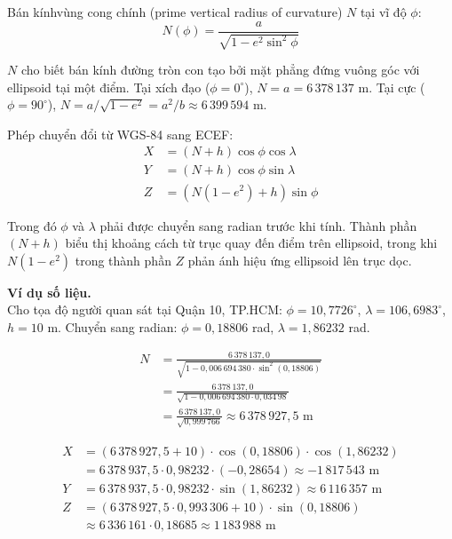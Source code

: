 Bán kínhvùng cong chính (prime vertical radius of curvature) $N$ tại vĩ độ $\phi$:
\begin{equation}
    N(\phi) = \frac{a}{\sqrt{1 - e^2 \sin^2\phi}}
\end{equation}

$N$ cho biết bán kính đường tròn con tạo bởi mặt phẳng đứng vuông góc với ellipsoid tại một điểm. Tại xích đạo ($\phi = 0^\circ$), $N = a = 6\,378\,137$ m. Tại cực ($\phi = 90^\circ$), $N = a / \sqrt{1 - e^2} = a^2/b \approx 6\,399\,594$ m.

Phép chuyển đổi từ WGS-84 sang ECEF:
\begin{equation}
\begin{aligned}
    X &= (N + h) \cos\phi \cos\lambda \\
    Y &= (N + h) \cos\phi \sin\lambda \\
    Z &= \left(N(1 - e^2) + h\right) \sin\phi
\end{aligned}
\end{equation}

Trong đó $\phi$ và $\lambda$ phải được chuyển sang radian trước khi tính. Thành phần $(N + h)$ biểu thị khoảng cách từ trục quay đến điểm trên ellipsoid, trong khi $N(1 - e^2)$ trong thành phần $Z$ phản ánh hiệu ứng ellipsoid lên trục dọc.

\textbf{Ví dụ số liệu.\\} Cho tọa độ người quan sát tại Quận 10, TP.HCM: $\phi = 10{,}7726^\circ$, $\lambda = 106{,}6983^\circ$, $h = 10$ m. Chuyển sang radian: $\phi = 0{,}18806$ rad, $\lambda = 1{,}86232$ rad.

\begin{align*}
    N &= \frac{6\,378\,137{,}0}{\sqrt{1 - 0{,}006\,694\,380 \cdot \sin^2(0{,}18806)}} \\
      &= \frac{6\,378\,137{,}0}{\sqrt{1 - 0{,}006\,694\,380 \cdot 0{,}034\,98}} \\
      &= \frac{6\,378\,137{,}0}{\sqrt{0{,}999\,766}} \approx 6\,378\,927{,}5 \text{ m}
\end{align*}

\begin{align*}
    X &= (6\,378\,927{,}5 + 10) \cdot \cos(0{,}18806) \cdot \cos(1{,}86232) \\
      &= 6\,378\,937{,}5 \cdot 0{,}98232 \cdot (-0,28654) \approx -1\,817\,543 \text{ m} \\
    Y &= 6\,378\,937{,}5 \cdot 0{,}98232 \cdot \sin(1{,}86232) \approx 6\,116\,357 \text{ m} \\
    Z &= (6\,378\,927{,}5 \cdot 0{,}993\,306 + 10) \cdot \sin(0{,}18806) \\
      &\approx 6\,336\,161 \cdot 0{,}18685 \approx 1\,183\,988 \text{ m}
\end{align*}


